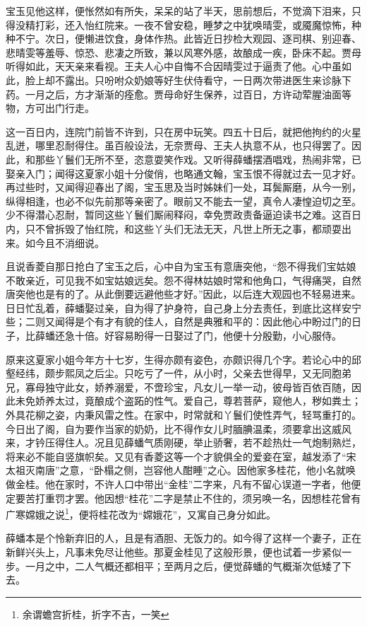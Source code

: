 \documentclass[12pt,oneside]{book}
\begin{document}
宝玉见他这样，便怅然如有所失，呆呆的站了半天，思前想后，不觉滴下泪来，只得没精打彩，还入怡红院来。一夜不曾安稳，睡梦之中犹唤晴雯，或魇魔惊怖，种种不宁。次日，便懒进饮食，身体作热。此皆近日抄检大观园、逐司棋、别迎春、悲晴雯等羞辱、惊恐、悲凄之所致，兼以风寒外感，故酿成一疾，卧床不起。贾母听得如此，天天亲来看视。王夫人心中自悔不合因晴雯过于逼责了他。心中虽如此，脸上却不露出。只吩咐众奶娘等好生伏侍看守，一日两次带进医生来诊脉下药。一月之后，方才渐渐的痊愈。贾母命好生保养，过百日，方许动荤腥油面等物，方可出门行走。

这一百日内，连院门前皆不许到，只在房中玩笑。四五十日后，就把他拘约的火星乱迸，哪里忍耐得住。虽百般设法，无奈贾母、王夫人执意不从，也只得罢了。因此，和那些丫鬟们无所不至，恣意耍笑作戏。又听得薛蟠摆酒唱戏，热闹非常，已娶亲入门；闻得这夏家小姐十分俊俏，也略通文翰，宝玉恨不得就过去一见才好。再过些时，又闻得迎春出了阁，宝玉思及当时姊妹们一处，耳鬓厮磨，从今一别，纵得相逢，也必不似先前那等亲密了。眼前又不能去一望，真令人凄惶迫切之至。少不得潜心忍耐，暂同这些丫鬟们厮闹释闷，幸免贾政责备逼迫读书之难。这百日内，只不曾拆毁了怡红院，和这些丫头们无法无天，凡世上所无之事，都顽耍出来。如今且不消细说。

且说香菱自那日抢白了宝玉之后，心中自为宝玉有意唐突他，“怨不得我们宝姑娘不敢亲近，可见我不如宝姑娘远矣。怨不得林姑娘时常和他角口，气得痛哭，自然唐突他也是有的了。从此倒要远避他些才好。”因此，以后连大观园也不轻易进来。日日忙乱着，薛蟠娶过亲，自为得了护身符，自己身上分去责任，到底比这样安宁些；二则又闻得是个有才有貌的佳人，自然是典雅和平的：因此他心中盼过门的日子，比薛蟠还急十倍。好容易盼得一日娶过了门，他便十分殷勤，小心服侍。

原来这夏家小姐今年方十七岁，生得亦颇有姿色，亦颇识得几个字。若论心中的邱壑经纬，颇步熙凤之后尘。只吃亏了一件，从小时，父亲去世得早，又无同胞弟兄，寡母独守此女，娇养溺爱，不啻珍宝，凡女儿一举一动，彼母皆百依百随，因此未免娇养太过，竟酿成个盗跖的性气。爱自己，尊若菩萨，窥他人，秽如粪土；外具花柳之姿，内秉风雷之性。在家中，时常就和丫鬟们使性弄气，轻骂重打的。今日出了阁，自为要作当家的奶奶，比不得作女儿时腼腆温柔，须要拿出这威风来，才钤压得住人。况且见薛蟠气质刚硬，举止骄奢，若不趁热灶一气炮制熟烂，将来必不能自竖旗帜矣。又见有香菱这等一个才貌俱全的爱妾在室，越发添了“宋太祖灭南唐”之意，“卧榻之侧，岂容他人酣睡”之心。因他家多桂花，他小名就唤做金桂。他在家时，不许人口中带出“金桂”二字来，凡有不留心误道一字者，他便定要苦打重罚才罢。他因想“桂花”二字是禁止不住的，须另唤一名，因想桂花曾有广寒嫦娥之说\footnote{余谓蟾宫折桂，折字不吉，一笑}，便将桂花改为“嫦娥花”，又寓自己身分如此。

薛蟠本是个怜新弃旧的人，且是有酒胆、无饭力的。如今得了这样一个妻子，正在新鲜兴头上，凡事未免尽让他些。那夏金桂见了这般形景，便也试着一步紧似一步。一月之中，二人气概还都相平；至两月之后，便觉薛蟠的气概渐次低矮了下去。
\end{document}
